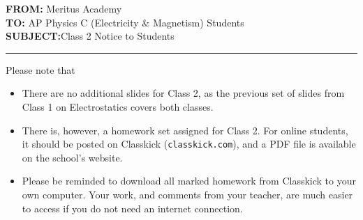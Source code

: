 \documentclass[letterpaper,11pt]{article}
\begin{document}
\textbf{FROM:}\tabto{1.3in} Meritus Academy\\
\textbf{TO:}\tabto{1.3in} AP Physics C (Electricity \& Magnetism) Students\\
\textbf{SUBJECT:}\tabto{1.3in}Class 2 Notice to Students

\vspace{.2in}\hrule

Please note that

\begin{itemize}[itemsep=4pt,topsep=0pt,leftmargin=15pt]
\item There are no additional slides for Class 2, as the previous set of
  slides from Class 1 on Electrostatics covers both classes.

\item There is, however, a homework set assigned for Class 2. For online
  students, it should be posted on Classkick (\texttt{classkick.com}), and a
  PDF file is available on the school's website.

\item Please be reminded to download all marked homework from Classkick to your
  own computer. Your work, and comments from your teacher, are much easier to
  access if you do not need an internet connection.
\end{itemize}
\end{document}
